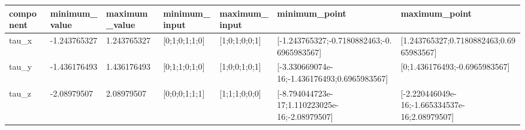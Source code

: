 \begin{tabular}{@{}lllllll@{}}
\toprule
component & minimum\_value & maximum\_value & minimum\_input & maximum\_input & minimum\_point & maximum\_point \\
\midrule
tau\_x & -1.243765327 & 1.243765327 & [0;1;0;1;1;0] & [1;0;1;0;0;1] & [-1.243765327;-0.7180882463;-0.6965983567] & [1.243765327;0.7180882463;0.6965983567] \\
tau\_y & -1.436176493 & 1.436176493 & [0;1;1;0;1;0] & [1;0;0;1;0;1] & [-3.330669074e-16;-1.436176493;0.6965983567] & [0;1.436176493;-0.6965983567] \\
tau\_z & -2.08979507 & 2.08979507 & [0;0;0;1;1;1] & [1;1;1;0;0;0] & [-8.794044723e-17;1.110223025e-16;-2.08979507] & [-2.220446049e-16;-1.665334537e-16;2.08979507] \\
\bottomrule
\end{tabular}
